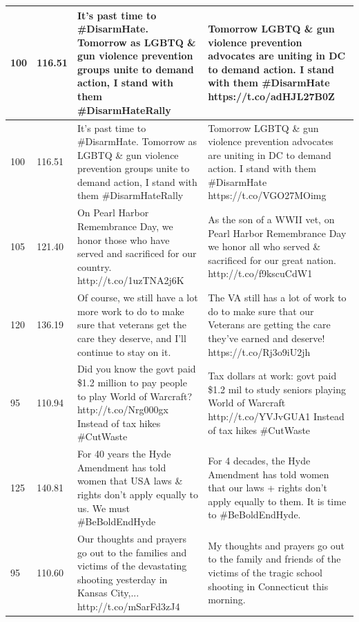 \documentclass[11pt]{article}
\begin{document}
\begin{flushleft}
\begin{table}[]
\begin{tabular}{|p{}|p{}|p{}|p{}|}
100      & 116.51    & It's past time to \#DisarmHate. Tomorrow as LGBTQ \& gun violence prevention groups unite to demand action, I stand with them \#DisarmHateRally      & Tomorrow LGBTQ \& gun violence prevention advocates are uniting in DC to demand action. I stand with them \#DisarmHate https://t.co/adHJL27B0Z        \\ \hline
100      & 116.51    & It's past time to \#DisarmHate. Tomorrow as LGBTQ \& gun violence prevention groups unite to demand action, I stand with them \#DisarmHateRally      & Tomorrow LGBTQ \& gun violence prevention advocates are uniting in DC to demand action. I stand with them \#DisarmHate https://t.co/VGO27MOimg        \\ \hline
105      & 121.40    & On Pearl Harbor Remembrance Day, we honor those who have served and sacrificed for our country. http://t.co/1uzTNA2j6K                                   & As the son of a WWII vet, on Pearl Harbor Remembrance Day we honor all who served \& sacrificed for our great nation. http://t.co/f9kscuCdW1          \\ \hline
120      & 136.19    & Of course, we still have a lot more work to do to make sure that veterans get the care they deserve, and I'll continue to stay on it.                    & The VA still has a lot of work to do to make sure that our Veterans are getting the care they've earned and deserve! https://t.co/Rj3o9iU2jh              \\ \hline
95       & 110.94    & Did you know the govt paid \$1.2 million to pay people to play World of Warcraft? http://t.co/Nrg000gx Instead of tax hikes \#CutWaste                   & Tax dollars at work: govt paid \$1.2 mil to study seniors playing World of Warcraft http://t.co/YVJvGUA1 Instead of tax hikes \#CutWaste                  \\ \hline
125      & 140.81    & For 40 years the Hyde Amendment has told women that USA laws \& rights don't apply equally to us. We must \#BeBoldEndHyde                            & For 4 decades, the Hyde Amendment has told women that our laws + rights don't apply equally to them. It is time to \#BeBoldEndHyde.                       \\ \hline
95       & 110.60    & Our thoughts and prayers go out to the families and victims of the devastating shooting yesterday in Kansas City,... http://t.co/mSarFd3zJ4              & My thoughts and prayers go out to the family and friends of the victims of the tragic school shooting in Connecticut this morning.                        \\ \hline

\end{tabular}
\end{table}
\end{flushleft}
\end{document}
